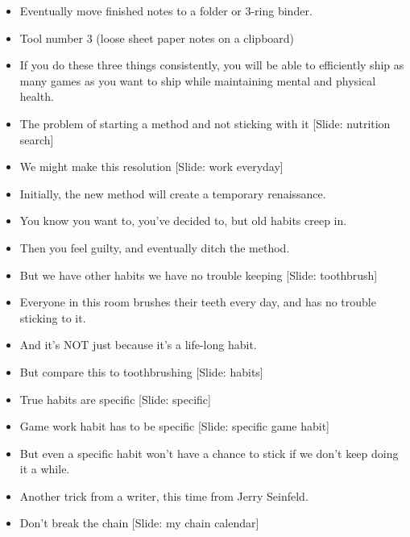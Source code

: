 \documentclass[12pt]{article}
\begin{document}
{\begin{itemize}
\item Eventually move finished notes to a folder or 3-ring binder.

\item Tool number 3 (loose sheet paper notes on a clipboard)





\item If you do these three things consistently, you will be able to efficiently ship as many games as you want to ship while maintaining mental and physical health.

\item The problem of starting a method and not sticking with it [Slide: nutrition search]

\item We might make this resolution [Slide: work everyday]

\item Initially, the new method will create a temporary renaissance.

\item You know you want to, you've decided to, but old habits creep in.

\item Then you feel guilty, and eventually ditch the method.

\item But we have other habits we have no trouble keeping [Slide: toothbrush]

\item Everyone in this room brushes their teeth every day, and has no trouble sticking to it.

\item And it's NOT just because it's a life-long habit.

\item But compare this to toothbrushing [Slide: habits]

\item True habits are specific [Slide: specific]

\item Game work habit has to be specific [Slide: specific game habit]

\item But even a specific habit won't have a chance to stick if we don't keep doing it a while.


\item Another trick from a writer, this time from Jerry Seinfeld.

\item Don't break the chain [Slide: my chain calendar]


\end{itemize}}
\end{document}
